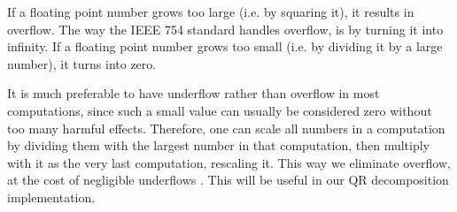 \noindent If a floating point number grows too large (i.e. by squaring it), it results in overflow. The way the IEEE 754 standard handles overflow, is by turning it into infinity. If a floating point number grows too small (i.e. by dividing it by a large number), it turns into zero. 

It is much preferable to have underflow rather than overflow in most computations, since such a small value can usually be considered zero without too many harmful effects. Therefore, one can scale all numbers in a computation by dividing them with the largest number in that computation, then multiply with it as the very last computation, rescaling it. This way we eliminate overflow, at the cost of negligible underflows \cite{afternotes}. This will be useful in our QR decomposition implementation.

